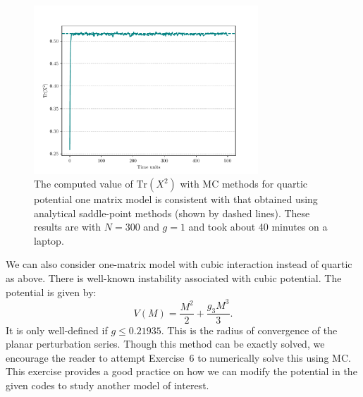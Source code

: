 \documentclass[11pt]{article}
\begin{document}
\begin{figure}[htbp] 
	\centering 
	\includegraphics[width=0.75\textwidth]{figs/mm_plot.pdf}
	\caption{\label{fig:1MM_res}The computed value of $\mbox{Tr}(X^2)$ with MC methods for quartic potential
		one matrix model is consistent with that obtained using analytical saddle-point methods (shown by dashed lines). 
		These results are with $N = 300$ and $g = 1$ and took about 40 minutes on a laptop.}
\end{figure}
We can also consider one-matrix model with cubic interaction instead of quartic as above. 
There is well-known instability associated with cubic potential. The potential is given by:
\begin{equation}
	V(M) = \frac{M^2}{2} + \frac{g_{3}M^3}{3}.  
\end{equation}
It is only well-defined if $g \le 0.21935$. This is the radius of convergence of the planar perturbation series. 
Though this method can be exactly solved, we encourage the reader to attempt Exercise~6 to numerically solve this using MC. This exercise provides a good practice on how we can modify the potential in the given codes to study another model of interest. 
\end{document}
